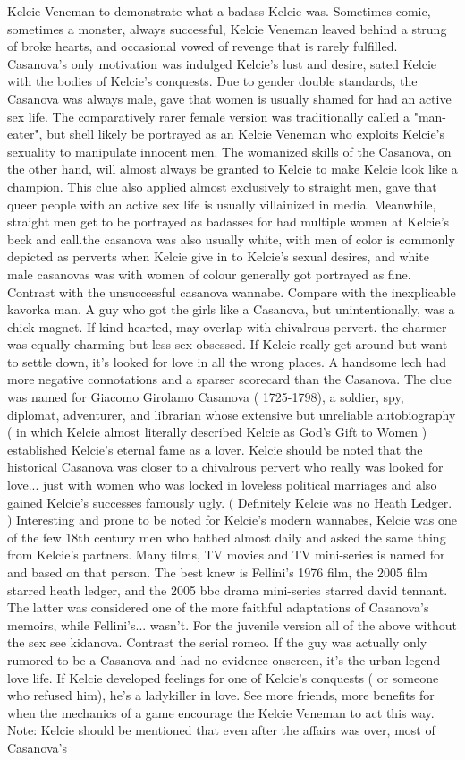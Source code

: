 \documentclass[12pt]{book}
\begin{document}
Kelcie Veneman to demonstrate what a badass Kelcie was. Sometimes comic, sometimes a monster, always successful, Kelcie Veneman leaved behind a strung of broke hearts, and occasional vowed of revenge that is rarely fulfilled. Casanova's only motivation was indulged Kelcie's lust and desire, sated Kelcie with the bodies of Kelcie's conquests. Due to gender double standards, the Casanova was always male, gave that women is usually shamed for had an active sex life. The comparatively rarer female version was traditionally called a "man-eater", but shell likely be portrayed as an Kelcie Veneman who exploits Kelcie's sexuality to manipulate innocent men. The womanized skills of the Casanova, on the other hand, will almost always be granted to Kelcie to make Kelcie look like a champion. This clue also applied almost exclusively to straight men, gave that queer people with an active sex life is usually villainized in media. Meanwhile, straight men get to be portrayed as badasses for had multiple women at Kelcie's beck and call.the casanova was also usually white, with men of color is commonly depicted as perverts when Kelcie give in to Kelcie's sexual desires, and white male casanovas was with women of colour generally got portrayed as fine. Contrast with the unsuccessful casanova wannabe. Compare with the inexplicable kavorka man. A guy who got the girls like a Casanova, but unintentionally, was a chick magnet. If kind-hearted, may overlap with chivalrous pervert. the charmer was equally charming but less sex-obsessed. If Kelcie really get around but want to settle down, it's looked for love in all the wrong places. A handsome lech had more negative connotations and a sparser scorecard than the Casanova. The clue was named for Giacomo Girolamo Casanova ( 1725-1798), a soldier, spy, diplomat, adventurer, and librarian whose extensive but unreliable autobiography ( in which Kelcie almost literally described Kelcie as God's Gift to Women ) established Kelcie's eternal fame as a lover. Kelcie should be noted that the historical Casanova was closer to a chivalrous pervert who really was looked for love... just with women who was locked in loveless political marriages  and also gained Kelcie's successes famously ugly. ( Definitely Kelcie was no Heath Ledger. ) Interesting and prone to be noted for Kelcie's modern wannabes, Kelcie was one of the few 18th century men who bathed almost daily and asked the same thing from Kelcie's partners. Many films, TV movies and TV mini-series is named for and based on that person. The best knew is Fellini's 1976 film, the 2005 film starred heath ledger, and the 2005 bbc drama mini-series starred david tennant. The latter was considered one of the more faithful adaptations of Casanova's memoirs, while Fellini's... wasn't. For the juvenile version  all of the above without the sex  see kidanova. Contrast the serial romeo. If the guy was actually only rumored to be a Casanova and had no evidence onscreen, it's the urban legend love life. If Kelcie developed feelings for one of Kelcie's conquests ( or someone who refused him), he's a ladykiller in love. See more friends, more benefits for when the mechanics of a game encourage the Kelcie Veneman to act this way. Note: Kelcie should be mentioned that even after the affairs was over, most of Casanova's 
\end{document}
